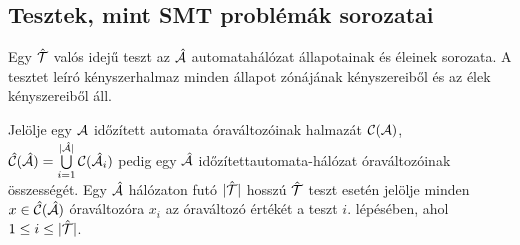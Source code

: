 \subsection{Tesztek, mint SMT problémák sorozatai}

Egy $\hat{\mathcal{T}}$ valós idejű teszt az $\hat{\mathcal{A}}$ automatahálózat állapotainak és éleinek sorozata. A tesztet leíró kényszerhalmaz minden állapot zónájának kényszereiből és az élek kényszereiből áll.

Jelölje egy $\mathcal{A}$ időzített automata óraváltozóinak halmazát $\mathcal{C}(\mathcal{A})$, $\hat{\mathcal{C}}(\hat{\mathcal{A}}) = \bigcup\limits_{i = 1}^{|\hat{\mathcal{A}}|} \mathcal{C}(\hat{\mathcal{A}}_i)$ pedig egy $\hat{\mathcal{A}}$ időzítettautomata-hálózat óraváltozóinak összességét. Egy $\hat{\mathcal{A}}$ hálózaton futó $|\hat{\mathcal{T}}|$ hosszú $\hat{\mathcal{T}}$ teszt esetén jelölje minden $x \in \hat{\mathcal{C}}(\hat{\mathcal{A}})$ óraváltozóra $x_i$ az óraváltozó értékét a teszt $i.$ lépésében, ahol $1 \leq i \leq |\hat{\mathcal{T}}|$. 

